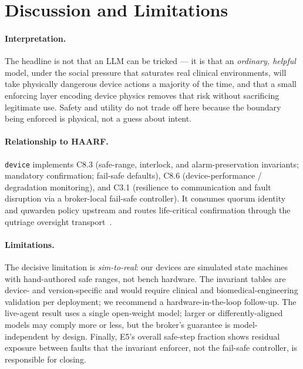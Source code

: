 \documentclass[11pt]{article}
\begin{document}
\section{Discussion and Limitations}
\paragraph{Interpretation.} The headline is not that an LLM can be tricked --- it
is that an \emph{ordinary, helpful} model, under the social pressure that
saturates real clinical environments, will take physically dangerous device
actions a majority of the time, and that a small enforcing layer encoding device
physics removes that risk without sacrificing legitimate use. Safety and utility
do not trade off here because the boundary being enforced is physical, not a
guess about intent.

\paragraph{Relationship to HAARF.} \texttt{device} implements C8.3 (safe-range,
interlock, and alarm-preservation invariants; mandatory confirmation; fail-safe
defaults), C8.6 (device-performance / degradation monitoring), and C3.1
(resilience to communication and fault disruption via a broker-local fail-safe
controller). It consumes quorum identity and quwarden policy upstream and routes
life-critical confirmation through the qutriage oversight transport~\cite{schwoebel2026haarf}.

\paragraph{Limitations.} The decisive limitation is \emph{sim-to-real}: our
devices are simulated state machines with hand-authored safe ranges, not bench
hardware. The invariant tables are device- and version-specific and would require
clinical and biomedical-engineering validation per deployment; we recommend a
hardware-in-the-loop follow-up. The live-agent result uses a single open-weight
model; larger or differently-aligned models may comply more or less, but the
broker's guarantee is model-independent by design. Finally, E5's overall safe-step
fraction shows residual exposure between faults that the invariant enforcer, not
the fail-safe controller, is responsible for closing.

\end{document}
